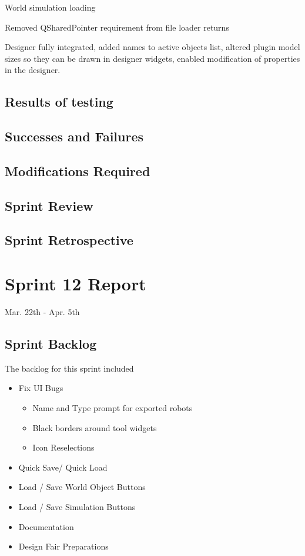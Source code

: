 World simulation loading

Removed QSharedPointer requirement from file loader returns

Designer fully integrated, added names to active objects list, altered plugin model sizes so they can be drawn in designer widgets, enabled modification of properties in the designer. 

\subsection{Results of testing}


\subsection{Successes and Failures}


\subsection{Modifications Required}


\subsection{Sprint Review}


\subsection{Sprint Retrospective}
\section{Sprint 12 Report}
Mar. 22th - Apr. 5th
\subsection{Sprint Backlog}

The backlog for this sprint included 

\begin{itemize}
	\item Fix UI Bugs
\begin{itemize}
	\item Name and Type prompt for exported robots
	\item Black borders around tool widgets
	\item Icon Reselections
\end{itemize}
	\item Quick Save/ Quick Load
	\item Load / Save World Object Buttons
	\item Load / Save Simulation Buttons
	\item Documentation
	\item Design Fair Preparations
\end{itemize}

